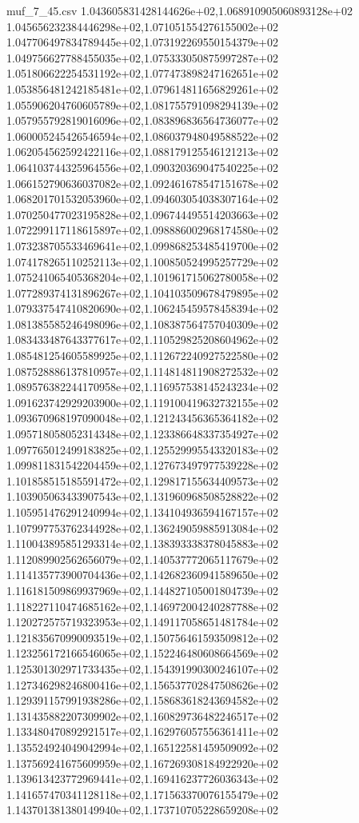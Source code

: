 \begin{filecontents*}{muf_7_45.csv}
1.043605831428144626e+02,1.068910905060893128e+02
1.045656232384446298e+02,1.071051554276155002e+02
1.047706497834789445e+02,1.073192269550154379e+02
1.049756627788455035e+02,1.075333050875997287e+02
1.051806622254531192e+02,1.077473898247162651e+02
1.053856481242185481e+02,1.079614811656829261e+02
1.055906204760605789e+02,1.081755791098294139e+02
1.057955792819016096e+02,1.083896836564736077e+02
1.060005245426546594e+02,1.086037948049588522e+02
1.062054562592422116e+02,1.088179125546121213e+02
1.064103744325964556e+02,1.090320369047540225e+02
1.066152790636037082e+02,1.092461678547151678e+02
1.068201701532053960e+02,1.094603054038307164e+02
1.070250477023195828e+02,1.096744495514203663e+02
1.072299117118615897e+02,1.098886002968174580e+02
1.073238705533469641e+02,1.099868253485419700e+02
1.074178265110252113e+02,1.100850524995257729e+02
1.075241065405368204e+02,1.101961715062780058e+02
1.077289374131896267e+02,1.104103509678479895e+02
1.079337547410820690e+02,1.106245459578458394e+02
1.081385585246498096e+02,1.108387564757040309e+02
1.083433487643377617e+02,1.110529825208604962e+02
1.085481254605589925e+02,1.112672240927522580e+02
1.087528886137810957e+02,1.114814811908272532e+02
1.089576382244170958e+02,1.116957538145243234e+02
1.091623742929203900e+02,1.119100419632732155e+02
1.093670968197090048e+02,1.121243456365364182e+02
1.095718058052314348e+02,1.123386648337354927e+02
1.097765012499183825e+02,1.125529995543320183e+02
1.099811831542204459e+02,1.127673497977539228e+02
1.101858515185591472e+02,1.129817155634409573e+02
1.103905063433907543e+02,1.131960968508528822e+02
1.105951476291240994e+02,1.134104936594167157e+02
1.107997753762344928e+02,1.136249059885913084e+02
1.110043895851293314e+02,1.138393338378045883e+02
1.112089902562656079e+02,1.140537772065117679e+02
1.114135773900704436e+02,1.142682360941589650e+02
1.116181509869937969e+02,1.144827105001804739e+02
1.118227110474685162e+02,1.146972004240287788e+02
1.120272575719323953e+02,1.149117058651481784e+02
1.121835670990093519e+02,1.150756461593509812e+02
1.123256172166546065e+02,1.152246480608664569e+02
1.125301302971733435e+02,1.154391990300246107e+02
1.127346298246800416e+02,1.156537702847508626e+02
1.129391157991938286e+02,1.158683618243694582e+02
1.131435882207309902e+02,1.160829736482246517e+02
1.133480470892921517e+02,1.162976057556361411e+02
1.135524924049042994e+02,1.165122581459509092e+02
1.137569241675609959e+02,1.167269308184922920e+02
1.139613423772969441e+02,1.169416237726036343e+02
1.141657470341128118e+02,1.171563370076155479e+02
1.143701381380149940e+02,1.173710705228659208e+02

\end{filecontents*}
